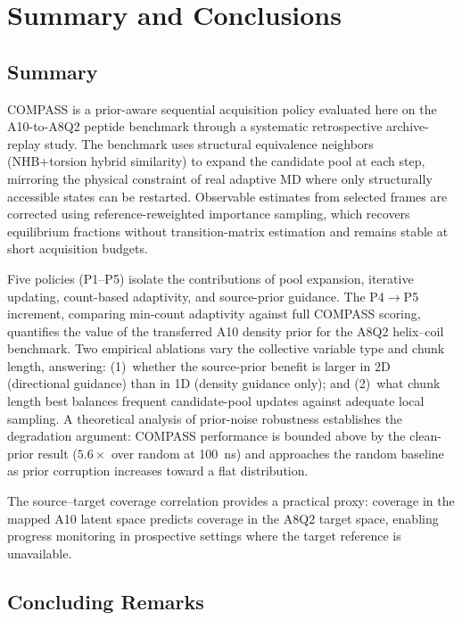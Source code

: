 \chapter{Summary and Conclusions}\label{chap:conclusions}

\section{Summary}

COMPASS is a prior-aware sequential acquisition policy evaluated here on the A10-to-A8Q2 peptide benchmark through a systematic retrospective archive-replay study.
The benchmark uses structural equivalence neighbors (NHB+torsion hybrid similarity) to expand the candidate pool at each step, mirroring the physical constraint of real adaptive MD where only structurally accessible states can be restarted.
Observable estimates from selected frames are corrected using reference-reweighted importance sampling, which recovers equilibrium fractions without transition-matrix estimation and remains stable at short acquisition budgets.

Five policies (P1--P5) isolate the contributions of pool expansion, iterative updating, count-based adaptivity, and source-prior guidance.
The P4$\to$P5 increment, comparing min-count adaptivity against full COMPASS scoring, quantifies the value of the transferred A10 density prior for the A8Q2 helix--coil benchmark.
Two empirical ablations vary the collective variable type and chunk length, answering: (1)~whether the source-prior benefit is larger in 2D (directional guidance) than in 1D (density guidance only); and (2)~what chunk length best balances frequent candidate-pool updates against adequate local sampling.
A theoretical analysis of prior-noise robustness establishes the degradation argument: COMPASS performance is bounded above by the clean-prior result ($5.6\times$ over random at 100~ns) and approaches the random baseline as prior corruption increases toward a flat distribution.

The source--target coverage correlation provides a practical proxy: coverage in the mapped A10 latent space predicts coverage in the A8Q2 target space, enabling progress monitoring in prospective settings where the target reference is unavailable.

\section{Concluding Remarks}

